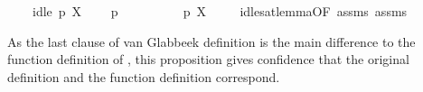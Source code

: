 \begin{isabellebody}
\ \ \ \ {\isacartoucheopen}idle\ p\ X{\isacartoucheclose}\isanewline
\ \ \ \ {\isacartoucheopen}p\ {\isasymTTurnstile}\ {\isasymphi}{\isacartoucheclose}\isanewline
\ \ \ \isanewline
\ \ \ \ {\isacartoucheopen}p\ {\isasymTTurnstile}{\isacharbrackleft}{\kern0pt}X{\isacharbrackright}{\kern0pt}\ {\isasymphi}{\isacartoucheclose}\isanewline
%
\isadelimproof
\ \ %
\endisadelimproof
%
\isatagproof
{}\isamarkupfalse%
\ idle{\isacharunderscore}{\kern0pt}sat{\isacharunderscore}{\kern0pt}lemma{\isacharbrackleft}{\kern0pt}OF\ assms{\isacharparenleft}{\kern0pt}{}{\isacharcomma}{\kern0pt}{}{\isacharparenright}{\kern0pt}{\isacharbrackright}{\kern0pt}\ assms{\isacharparenleft}{\kern0pt}{}{\isacharparenright}{\kern0pt}\ \isacommand{{\isachardot}{\kern0pt}{\isachardot}{\kern0pt}}\isamarkupfalse%
%
\endisatagproof
{\isafoldproof}%
%
\isadelimproof
%
\endisadelimproof
%
\begin{isamarkuptext}%
As the last clause of van Glabbeek definition is the main difference to the function definition of , this proposition gives confidence that the original definition and the function definition correspond.%
\end{isamarkuptext}\isamarkuptrue%
\isamarkupfalse%
\ %
%
\isadelimtheory
%
\endisadelimtheory
%
\isatagtheory
%
\endisatagtheory
{\isafoldtheory}%
%
\isadelimtheory
%
\endisadelimtheory
%
\end{isabellebody}%
\endinput
